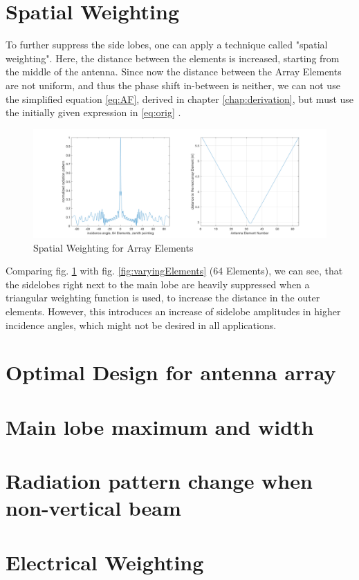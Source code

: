 \section{Spatial Weighting}
To further suppress the side lobes, one can apply a technique called "spatial weighting". Here, the distance between the elements is increased, starting from the middle of the antenna.
Since now the distance between the Array Elements are not uniform, and thus the phase shift in-between is neither, we can not use the simplified equation \ref{eq:AF}, derived in chapter \ref{chap:derivation}, but must use the initially given expression in \ref{eq:orig} \citep{roettger1989instrumental}.

\begin{figure}[h!]
	\centering
	\includegraphics[width=\textwidth]{images/triangularSpatialWeight}
	\caption{Spatial Weighting for Array Elements}
	\label{fig:triangWeight}
\end{figure}

Comparing fig. \ref{fig:triangWeight} with fig. \ref{fig:varyingElements} (64 Elements), we can see, that the sidelobes right next to the main lobe are heavily suppressed when a triangular weighting function is used, to increase the distance in the outer elements. However, this introduces an increase of sidelobe amplitudes in higher incidence angles, which might not be desired in all applications.



\section{Optimal Design for antenna array}


\section{Main lobe maximum and width}


\section{Radiation pattern change when non-vertical beam}


\section{Electrical Weighting}
